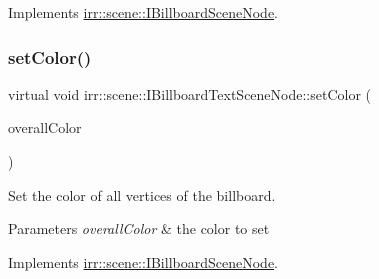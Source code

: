 Implements \hyperlink{classirr_1_1scene_1_1IBillboardSceneNode_a0b2729cc4913b0890ae28cf0ef0ab949}{irr\+::scene\+::\+I\+Billboard\+Scene\+Node}.

\mbox{\label{classirr_1_1scene_1_1IBillboardTextSceneNode_aaa65d10d3a49206728c47b148a64bb4a}} 
\subsubsection{\texorpdfstring{set\+Color()}{setColor()}\hspace{0.1cm}{\footnotesize\ttfamily [1/2]}}
{\footnotesize\ttfamily virtual void irr\+::scene\+::\+I\+Billboard\+Text\+Scene\+Node\+::set\+Color (\begin{DoxyParamCaption}\item[{const \hyperlink{classirr_1_1video_1_1SColor}{video\+::\+S\+Color} \&}]{overall\+Color }\end{DoxyParamCaption})\hspace{0.3cm}{\ttfamily [pure virtual]}}



Set the color of all vertices of the billboard. 


\begin{DoxyParams}{Parameters}
{\em overall\+Color} & the color to set \\
\hline
\end{DoxyParams}


Implements \hyperlink{classirr_1_1scene_1_1IBillboardSceneNode_a82c1038a6dfcd255863baa96aaba4182}{irr\+::scene\+::\+I\+Billboard\+Scene\+Node}.

\mbox{\label{classirr_1_1scene_1_1IBillboardTextSceneNode_ab3faa7c4238acd6bc3a2330cb5650da5}} 
